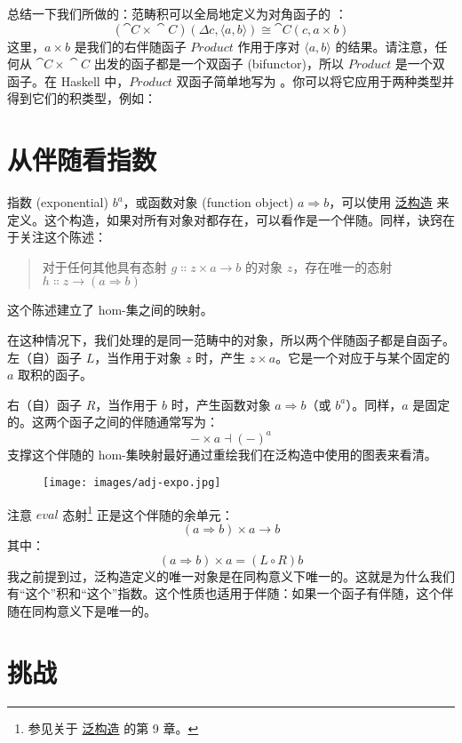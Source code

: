 总结一下我们所做的：范畴积可以全局地定义为对角函子的 ：
\[(\cat{C}\times{}\cat{C})(\Delta c, \langle a, b \rangle) \cong \cat{C}(c, a\times{}b)\]
这里，$a\times{}b$ 是我们的右伴随函子 $\mathit{Product}$ 作用于序对 $\langle a, b \rangle$ 的结果。请注意，任何从 $\cat{C}\times{}\cat{C}$ 出发的函子都是一个双函子 (bifunctor)，所以 $\mathit{Product}$ 是一个双函子。在 Haskell 中，$\mathit{Product}$ 双函子简单地写为 \code{(,)}。你可以将它应用于两种类型并得到它们的积类型，例如：


\section{从伴随看指数}

指数 (exponential) $b^a$，或函数对象 (function object) $a \Rightarrow b$，可以使用 \hyperref[function-types]{泛构造} 来定义。这个构造，如果对所有对象对都存在，可以看作是一个伴随。同样，诀窍在于关注这个陈述：

\begin{quote}
  对于任何其他具有态射 $g \Colon z\times{}a \to b$ 的对象 $z$，存在唯一的态射 $h \Colon z \to (a \Rightarrow b)$
\end{quote}
这个陈述建立了 hom-集之间的映射。

在这种情况下，我们处理的是同一范畴中的对象，所以两个伴随函子都是自函子。左（自）函子 $L$，当作用于对象 $z$ 时，产生 $z\times{}a$。它是一个对应于与某个固定的 $a$ 取积的函子。

右（自）函子 $R$，当作用于 $b$ 时，产生函数对象 $a \Rightarrow b$（或 $b^a$）。同样，$a$ 是固定的。这两个函子之间的伴随通常写为：
\[-\times{}a \dashv (-)^a\]
支撑这个伴随的 hom-集映射最好通过重绘我们在泛构造中使用的图表来看清。

\begin{figure}[H]
  \centering
  \texttt{[image: images/adj-expo.jpg]}
\end{figure}

\noindent
注意 $\mathit{eval}$ 态射\footnote{参见关于 \hyperref[function-types]{泛构造} 的第 9 章。} 正是这个伴随的余单元：
\[(a \Rightarrow b)\times{}a \to b\]
其中：
\[(a \Rightarrow b)\times{}a = (L \circ R) b\]
我之前提到过，泛构造定义的唯一对象是在同构意义下唯一的。这就是为什么我们有“这个”积和“这个”指数。这个性质也适用于伴随：如果一个函子有伴随，这个伴随在同构意义下是唯一的。

\section{挑战}

